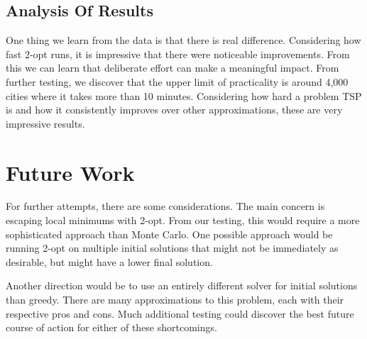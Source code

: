 \documentclass[12pt]{report}
\begin{document}
\begin{multicols}{2}
    \subsection{Analysis Of Results}
    One thing we learn from the data is that there is real difference. Considering how fast 2-opt runs, it is impressive that there were noticeable improvements. From this we can learn that deliberate effort can make a meaningful impact. From further testing, we discover that the upper limit of practicality is around 4,000 cities where it takes more than 10 minutes. Considering how hard a problem TSP is and how it consistently improves over other approximations, these are very impressive results.

    \section{Future Work}
    For further attempts, there are some considerations. The main concern is escaping local minimums with 2-opt. From our testing, this would require a more sophisticated approach than Monte Carlo. One possible approach would be running 2-opt on multiple initial solutions that might not be immediately as desirable, but might have a lower final solution.

    Another direction would be to use an entirely different solver for initial solutions than greedy. There are many approximations to this problem, each with their respective pros and cons. Much additional testing could discover the best future course of action for either of these shortcomings.
\end{multicols}
\end{document}
